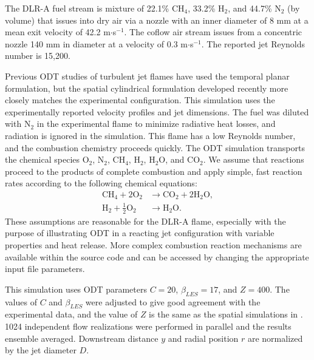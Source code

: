 \documentclass[preprint,12pt, a4paper]{elsarticle}
\begin{document}
The DLR-A fuel stream is mixture of 22.1\% CH$_4$, 33.2\% H$_2$, and 44.7\% N$_2$ (by volume) that issues into dry air via a nozzle with an inner diameter of 8 mm at a mean exit velocity of 42.2 m$\cdot$s$^{-1}$. The coflow air stream issues from a concentric nozzle 140 mm in diameter at a velocity of 0.3 m$\cdot$s$^{-1}$. The reported jet Reynolds number is 15,200.

Previous ODT studies of turbulent jet flames have used the temporal planar formulation, but the spatial cylindrical formulation developed recently \cite{Lignell_2018} more closely matches the experimental configuration. This simulation uses the experimentally reported velocity profiles and jet dimensions.  
The fuel was diluted with N$_2$ in the experimental flame to minimize radiative heat losses, and radiation is ignored in the simulation. This flame has a low Reynolds number, and the combustion chemistry proceeds quickly. The ODT simulation transports the chemical species O$_2$, N$_2$, CH$_4$, H$_2$, H$_2$O, and CO$_2$. We assume that reactions proceed to the products of complete combustion and apply simple, fast reaction rates according to the following chemical equations:
\begin{align}
	\mathrm{CH}_4 + 2\mathrm{O}_2 & \rightarrow \mathrm{CO}_2 + 2\mathrm{H}_2\mathrm{O}, \\
	\mathrm{H}_2+\frac{1}{2}\mathrm{O}_2 & \rightarrow \mathrm{H}_2\mathrm{O}.
\end{align}
These assumptions are reasonable for the DLR-A flame, especially with the purpose of illustrating ODT in a reacting jet configuration with variable properties and heat release. More complex combustion reaction mechanisms are available within the source code and can be accessed by changing the appropriate input file parameters. 

This simulation uses ODT parameters $C=20$, $\beta_{LES}=17$, and $Z=400$. The values of $C$ and $\beta_{LES}$ were adjusted to give good agreement with the experimental data, and the value of $Z$ is the same as the spatial simulations in \cite{Monson_2016}. 1024 independent flow realizations were performed in parallel and the results ensemble averaged. Downstream distance $y$ and radial position $r$ are normalized by the jet diameter $D$.
\end{document}
